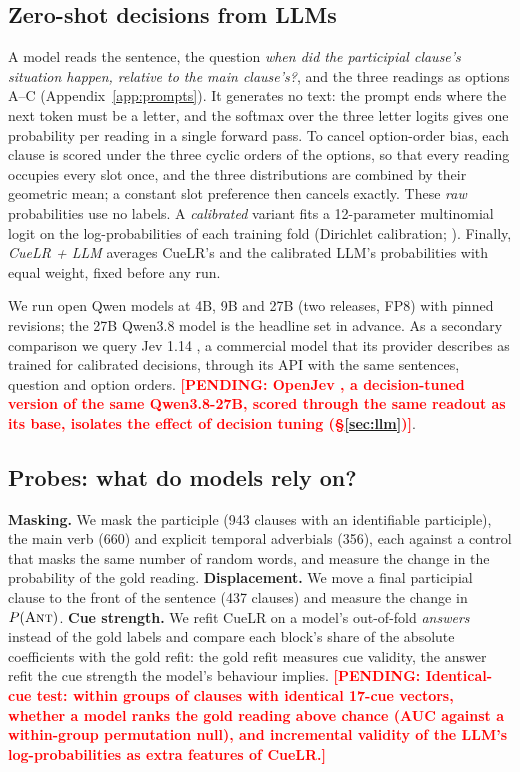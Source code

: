 \documentclass[11pt]{article}
\newcommand{\pending}[1]{\textcolor{red}{\textbf{[PENDING: #1]}}}
\begin{document}
\subsection{Zero-shot decisions from LLMs}
\label{sec:t5}
A model reads the sentence, the question \emph{when did the participial clause's situation happen, relative to the main clause's?}, and the three readings as options A--C (Appendix~\ref{app:prompts}). It generates no text: the prompt ends where the next token must be a letter, and the softmax over the three letter logits gives one probability per reading in a single forward pass. To cancel option-order bias, each clause is scored under the three cyclic orders of the options, so that every reading occupies every slot once, and the three distributions are combined by their geometric mean; a constant slot preference then cancels exactly. These \emph{raw} probabilities use no labels. A \emph{calibrated} variant fits a 12-parameter multinomial logit on the log-probabilities of each training fold (Dirichlet calibration; \citealp{kull2019dirichlet}). Finally, \emph{CueLR + LLM} averages CueLR's and the calibrated LLM's probabilities with equal weight, fixed before any run.

We run open Qwen models at 4B, 9B and 27B (two releases, FP8) with pinned revisions; the 27B Qwen3.8 model is the headline set in advance. As a secondary comparison we query Jev 1.14 \citep{typesafe2026jev}, a commercial model that its provider describes as trained for calibrated decisions, through its API with the same sentences, question and option orders. \pending{OpenJev \citep{openjev2026}, a decision-tuned version of the same Qwen3.8-27B, scored through the same readout as its base, isolates the effect of decision tuning (\S\ref{sec:llm})}.

\subsection{Probes: what do models rely on?}
\label{sec:probes}
\textbf{Masking.} We mask the participle (943 clauses with an identifiable participle), the main verb (660) and explicit temporal adverbials (356), each against a control that masks the same number of random words, and measure the change in the probability of the gold reading. \textbf{Displacement.} We move a final participial clause to the front of the sentence (437 clauses) and measure the change in $P(\textsc{Ant})$. \textbf{Cue strength.} We refit CueLR on a model's out-of-fold \emph{answers} instead of the gold labels and compare each block's share of the absolute coefficients with the gold refit: the gold refit measures cue validity, the answer refit the cue strength the model's behaviour implies. \pending{Identical-cue test: within groups of clauses with identical 17-cue vectors, whether a model ranks the gold reading above chance (AUC against a within-group permutation null), and incremental validity of the LLM's log-probabilities as extra features of CueLR.}
\end{document}
